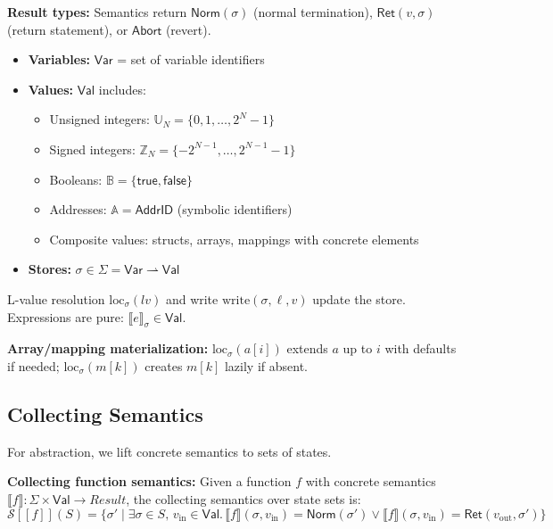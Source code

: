\documentclass[pdflatex,sn-basic]{sn-jnl}%
\theoremstyle{thmstyleone}%
\theoremstyle{thmstyletwo}%
\theoremstyle{thmstylethree}%
\newcommand{\Abort}{\mathsf{Abort}}
\newcommand{\Norm}{\mathsf{Norm}}
\newcommand{\Ret}{\mathsf{Ret}}
\begin{document}
\noindent\textbf{Result types:} Semantics return $\Norm(\sigma)$ (normal termination), $\Ret(v,\sigma)$ (return statement), or $\Abort$ (revert).

\medskip
\begin{itemize}
\item \textbf{Variables:} $\mathsf{Var}$ = set of variable identifiers
\item \textbf{Values:} $\mathsf{Val}$ includes:
  \begin{itemize}
  \item Unsigned integers: $\mathbb{U}_N = \{0,1,\ldots,2^N{-}1\}$
  \item Signed integers: $\mathbb{Z}_N = \{-2^{N-1},\ldots,2^{N-1}{-}1\}$
  \item Booleans: $\mathbb{B} = \{\mathsf{true},\mathsf{false}\}$
  \item Addresses: $\mathbb{A} = \mathsf{AddrID}$ (symbolic identifiers)
  \item Composite values: structs, arrays, mappings with concrete elements
  \end{itemize}
\item \textbf{Stores:} $\sigma \in \Sigma = \mathsf{Var} \rightharpoonup \mathsf{Val}$
\end{itemize}

\medskip
\noindent
L-value resolution $\mathrm{loc}_\sigma(\mathit{lv})$ and write $\mathrm{write}(\sigma,\ell,v)$ update the store. Expressions are pure: $\llbracket e\rrbracket_\sigma\in\mathsf{Val}$.

\noindent\textbf{Array/mapping materialization:}
$\mathrm{loc}_\sigma(a[i])$ extends $a$ up to $i$ with defaults if needed; $\mathrm{loc}_\sigma(m[k])$ creates $m[k]$ lazily if absent.

\subsection{Collecting Semantics}

For abstraction, we lift concrete semantics to sets of states.

\noindent\textbf{Collecting function semantics:} Given a function $f$ with concrete semantics $\llbracket f \rrbracket : \Sigma \times \mathsf{Val} \to \mathit{Result}$, the collecting semantics over state sets is:
\[
\mathcal{S}[[f]](S) = \{\sigma' \mid \exists \sigma \in S,\, v_{\text{in}} \in \mathsf{Val}.\, \llbracket f \rrbracket(\sigma, v_{\text{in}}) = \Norm(\sigma') \vee \llbracket f \rrbracket(\sigma, v_{\text{in}}) = \Ret(v_{\text{out}}, \sigma')\}
\]
\end{document}
